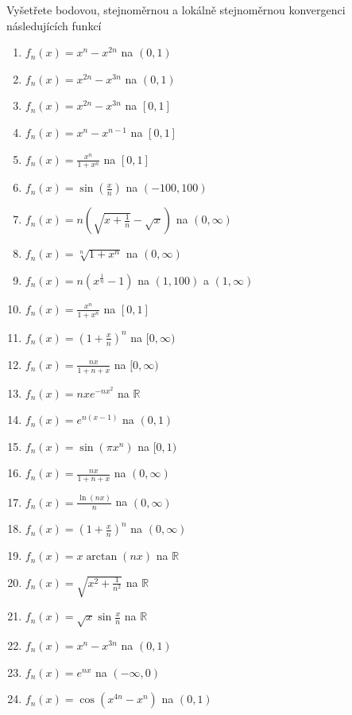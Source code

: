\begin{multicols}{2}

Vyšetřete bodovou, stejnoměrnou a lokálně stejnoměrnou konvergenci následujících funkcí
\begin{enumerate}
\item $f_n(x) = x^n - x^{2n}$ na $(0,1)$
\item $f_n(x) = x^{2n} - x^{3n}$ na $(0,1)$
\item $f_n(x) = x^{2n}- x^{3n}$ na $[0,1]$
\item $f_n(x) = x^{n}- x^{n-1}$ na $[0,1]$
\item $f_n(x) = \frac{x^n}{1+x^n}$ na $[0,1]$
\item $f_n(x) = \sin \left( \frac{x}{n} \right)$ na $(-100,100)$
\item $f_n(x) = n \left( \sqrt{x + \frac{1}{n}} - \sqrt{x} \right)$ na $(0,\infty)$
\item $f_n(x) = \sqrt[n]{1+x^n}$ na $(0,\infty)$
\item $f_n(x) = n \left( x^\frac{1}{n} - 1 \right)$ na $(1,100)$ a $(1,\infty)$
\item $f_n(x) = \frac{x^n}{1+x^n}$ na $[0,1]$
\item $f_n(x) = \left( 1 + \frac{x}{n} \right)^n$ na $[0,\infty)$
\item $f_n(x) = \frac{nx}{1+n+x}$ na $[0,\infty)$
\item $f_n(x) = nxe^{-nx^2}$ na $\mathbb{R}$
\item $f_n(x) = e^{n (x-1)}$ na $(0,1)$
\item $f_n(x) = \sin (\pi x^n)$ na $[0,1)$
\item $f_n(x) = \frac{nx}{1+n+x}$ na $(0,\infty)$
\item $f_n(x) = \frac{\ln (nx)}{n}$ na $(0,\infty)$
\item $f_n(x) = \left( 1 + \frac{x}{n} \right)^n$ na $(0,\infty)$
\item $f_n(x) = x \arctan (nx)$ na $\mathbb{R}$
\item $f_n(x) = \sqrt{x^2 + \frac{1}{n^2}}$ na $\mathbb{R}$
\item $f_n(x) = \sqrt{x} \sin \frac{x}{n}$ na $\mathbb{R}$
\item $f_n(x) = x^n - x^{3n}$ na $(0,1)$
\item $f_n(x) = e^{nx}$ na $(-\infty, 0)$
\item $f_n(x) = \cos \left( x^{4n} - x^{n} \right)$ na $(0,1)$
\end{enumerate}

\separator


\end{multicols}
